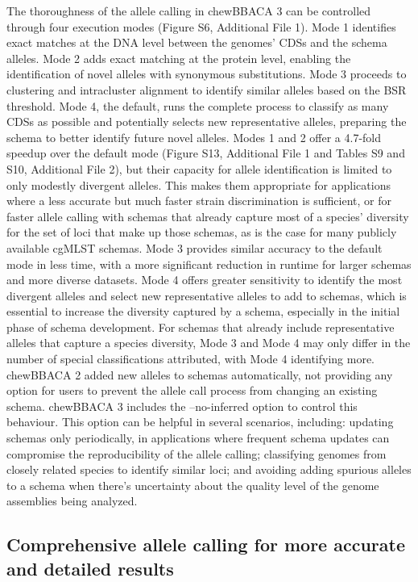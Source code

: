 The thoroughness of the allele calling in chewBBACA 3 can be controlled through four execution modes (Figure S6, Additional File 1). Mode 1 identifies exact matches at the DNA level between the genomes’ CDSs and the schema alleles. Mode 2 adds exact matching at the protein level, enabling the identification of novel alleles with synonymous substitutions. Mode 3 proceeds to clustering and intracluster alignment to identify similar alleles based on the BSR threshold. Mode 4, the default, runs the complete process to classify as many CDSs as possible and potentially selects new representative alleles, preparing the schema to better identify future novel alleles. Modes 1 and 2 offer a 4.7-fold speedup over the default mode (Figure S13, Additional File 1 and Tables S9 and S10, Additional File 2), but their capacity for allele identification is limited to only modestly divergent alleles. This makes them appropriate for applications where a less accurate but much faster strain discrimination is sufficient, or for faster allele calling with schemas that already capture most of a species’ diversity for the set of loci that make up those schemas, as is the case for many publicly available cgMLST schemas. Mode 3 provides similar accuracy to the default mode in less time, with a more significant reduction in runtime for larger schemas and more diverse datasets. Mode 4 offers greater sensitivity to identify the most divergent alleles and select new representative alleles to add to schemas, which is essential to increase the diversity captured by a schema, especially in the initial phase of schema development. For schemas that already include representative alleles that capture a species diversity, Mode 3 and Mode 4 may only differ in the number of special classifications attributed, with Mode 4 identifying more.
chewBBACA 2 added new alleles to schemas automatically, not providing any option for users to prevent the allele call process from changing an existing schema. chewBBACA 3 includes the --no-inferred option to control this behaviour. This option can be helpful in several scenarios, including: updating schemas only periodically, in applications where frequent schema updates can compromise the reproducibility of the allele calling; classifying genomes from closely related species to identify similar loci; and avoiding adding spurious alleles to a schema when there's uncertainty about the quality level of the genome assemblies being analyzed.

\subsection{Comprehensive allele calling for more accurate and detailed results} \label{ssec:results_discussion_ssec3}

